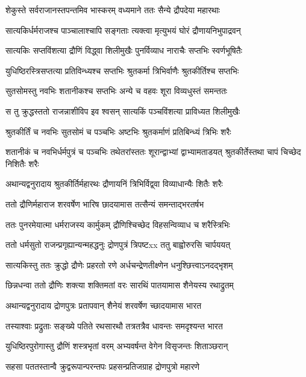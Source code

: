 \twolineshloka
{शेकुस्ते सर्वराजानस्तपन्तमिव भास्करम्}
{वध्यमाने ततः सैन्ये द्रौपदेया महारथाः}


\twolineshloka
{सात्यकिर्धर्मराजश्च पाञ्चालाश्चापि सङ्गताः}
{त्यक्त्वा मृत्युभयं घोरं द्रौणायनिभुपाद्रवन्}


\twolineshloka
{सात्यकिः सप्तविंशत्या द्रौणिं विद्ध्वा शिलीमुखैः}
{पुनर्विव्याध नाराचैः सप्तभिः स्वर्णभूषितैः}


\threelineshloka
{युधिष्ठिरस्त्रिसप्तत्या प्रतिविन्ध्यश्च सप्तभिः}
{श्रुतकर्मा त्रिभिर्वाणैः श्रुतकीर्तिश्च सप्तभिः}
{}


\twolineshloka
{सुतसोमस्तु नवभिः शतानीकश्च सप्तभिः}
{अन्ये च वहवः शूरा विव्यधुस्तं समन्ततः}


\twolineshloka
{स तु क्रुद्धस्ततो राजन्नाशीविप इव श्वसन्}
{सात्यकिं पञ्चविंशत्या प्राविध्यत शिलीमुखैः}


\twolineshloka
{श्रुतकीर्तिं च नवभिः सुतसोमं च पञ्चभिः}
{अष्टभिः श्रुतकर्माणं प्रतिबिन्ध्यं त्रिभिः शरैः}


\threelineshloka
{शतानीकं च नवभिर्धर्मपुत्रं च पञ्चभिः}
{तथेतरांस्ततः शूरान्द्वाभ्यां द्वाभ्यामताडयत्}
{श्रुतकीर्तेस्तथा चापं चिच्छेद निशितैः शरैः}


\twolineshloka
{अथान्यद्वनुरादाय श्रुतकीर्तिर्महारथः}
{द्रौणायनिं त्रिभिर्विद्व्वा विव्याधान्यैः शितैः शरैः}


\twolineshloka
{ततो द्रौणिर्महाराज शरवर्षेण भारिष}
{छादयामास तत्सैन्यं समन्ताद्भरतर्षभ}


\twolineshloka
{ततः पुनरमेयात्मा धर्मराजस्य कार्मुकम्}
{द्रौणिश्चिच्छेद विहसन्विव्याध च शरैस्त्रिभिः}


\twolineshloka
{ततो धर्मसुतो राजन्प्रगृह्यान्यन्महद्धनुः}
{द्रोणपुत्रं त्रिपष्टxx ततु बाह्वोरुरसि चार्पययत्}


\twolineshloka
{सात्यकिस्तु ततः क्रुद्धो द्रौणेः प्रहरतो रणे}
{अर्धचन्द्रेणतीक्ष्णेन धनुश्छित्त्वाऽनदद्भृशम्}


\twolineshloka
{छिन्नधन्वा ततो द्रौणिः शक्त्या शक्तिमतां वरः}
{सारथिं पातयामास शैनेयस्य रथाद्रुतम्}


\twolineshloka
{अथान्यद्वनुरादाय द्रोणपुत्रः प्रतापवान्}
{शैनेयं शरवर्षेण च्छादयामास भारत}


\twolineshloka
{तस्याश्वाः प्रद्रुताः सङ्ख्ये पतिते रथसारथौ}
{तत्रतत्रैव धावन्तः समदृश्यन्त भारत}


\twolineshloka
{युधिष्ठिरपुरोगास्तु द्रौणिं शस्त्रभृतां वरम्}
{अभ्यवर्षन्त वेगेन विसृजन्तः शिताञ्छरान्}


\twolineshloka
{सहसा पततस्तान्वै क्रुद्वरूपान्परन्तपः}
{प्रहसन्प्रतिजग्राह द्रोणपुत्रो महारणे}


